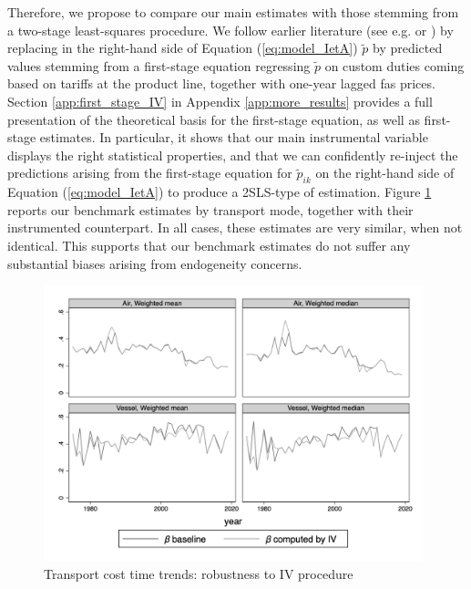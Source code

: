\documentclass[a4paper,11pt]{article}
\begin{document}
Therefore, we propose to compare our main estimates with those stemming from a two-stage least-squares procedure. We follow earlier literature (see e.g. \citealp{Caliendo_Parro_2015} or \citealp{Lashkaripour-2017}) by replacing in the right-hand side of Equation (\ref{eq:model_IetA}) $\widetilde{p}$ by predicted values stemming from a first-stage equation regressing $\widetilde{p}$ on custom duties coming based on tariffs at the product line, together with one-year lagged fas prices. Section \ref{app:first_stage_IV} in Appendix \ref{app:more_results} provides a full presentation of the theoretical basis for the first-stage equation, as well as first-stage estimates. In particular, it shows that our main instrumental variable displays the right statistical properties, and that we can confidently re-inject the predictions arising from the first-stage equation for $\widetilde{p}_{ik}$ on the right-hand side of Equation (\ref{eq:model_IetA}) %
 to produce a 2SLS-type of estimation. Figure \ref{fig:comp_IV_SITC5} reports our benchmark estimates by transport mode, together with their instrumented counterpart. In all cases, these estimates are very similar, when not identical. This supports that our benchmark estimates do not suffer any substantial biases arising from endogeneity concerns.

\begin{figure}[htbp]
\caption{Transport cost time trends: robustness to IV procedure}
\label{fig:comp_IV_SITC5}
\begin{center}
\includegraphics[height=8cm]
{scatter_chronology_baseline_IV_ref1_y_5_3.png}
\end{center}
\end{figure}
\end{document}
